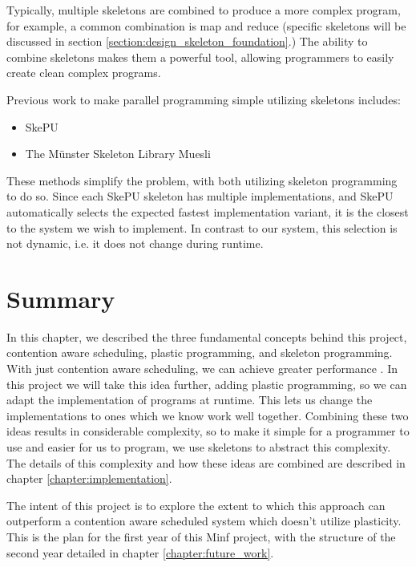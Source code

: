 Typically, multiple skeletons are combined to produce a more complex program, for example, a common combination is map and reduce (specific skeletons will be discussed in section \ref{section:design_skeleton_foundation}.) The ability to combine skeletons makes them a powerful tool, allowing programmers to easily create clean complex programs.

Previous work to make parallel programming simple utilizing skeletons includes:

\begin{itemize}
	\item SkePU \cite{skepu}
	\item The Münster Skeleton Library Muesli
\end{itemize}

These methods simplify the problem, with both utilizing skeleton programming to do so. Since each SkePU skeleton has multiple implementations, and SkePU automatically selects the expected fastest implementation variant, it is the closest to the system we wish to implement. In contrast to our system, this selection is not dynamic, i.e. it does not change during runtime. 



\section{Summary}

In this chapter, we described the three fundamental concepts behind this project, contention aware scheduling, plastic programming, and skeleton programming. With just contention aware scheduling, we can achieve greater performance \cite{lira}. In this project we will take this idea further, adding plastic programming, so we can adapt the implementation of programs at runtime. This lets us change the implementations to ones which we know work well together. Combining these two ideas results in considerable complexity, so to make it simple for a programmer to use and easier for us to program, we use skeletons to abstract this complexity. The details of this complexity and how these ideas are combined are described in chapter \ref{chapter:implementation}.

The intent of this project is to explore the extent to which this approach can outperform a contention aware scheduled system which doesn't utilize plasticity. This is the plan for the first year of this Minf project, with the structure of the second year detailed in chapter \ref{chapter:future_work}.